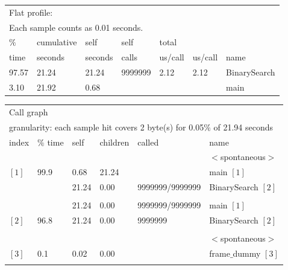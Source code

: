 \documentclass[11pt]{article}
\begin{document}
\begin{enumerate}
\begin{table}[H]
\begin{tabular}{l l l l l l l}
\multicolumn{7}{l}{Flat profile:}\\
\multicolumn{7}{l}{Each sample counts as 0.01 seconds.}\\
 $\%$  & cumulative &  self        &      self   &  total     &      &    \\
 time   & seconds     & seconds  &   calls    & us/call  & us/call & name    \\   
 97.57 &    21.24  &  21.24 & 9999999   &  2.12    & 2.12 & BinarySearch\\
  3.10    & 21.92  &   0.68    & & & &                         main\\
\end{tabular}
 \end{table}
 
\begin{table}[H]
\begin{tabular}{  l  l  l  l  l  l  }
\multicolumn{6}{l}{Call graph}\\
\multicolumn{6}{l}{granularity: each sample hit covers 2 byte(s) for 0.05$\%$ of 21.94 seconds}\\
index   & $\%$ time &   self & children  &  called  &   name \\
            &                   &           &                &              &  $<$spontaneous$>$ \\
$[1]$   &   99.9        & 0.68  &  21.24     &              &  main $[1]$ \\
            &                   & 21.24 &  0.00      & 9999999/9999999   &  BinarySearch $[2]$ \\
\hline \\
            &                  & 21.24  &  0.00      & 9999999/9999999 &    main $[1]$ \\
$[2]$   &  96.8       & 21.24  &  0.00      & 9999999                   &     BinarySearch $[2]$ \\
\hline \\
            &                   &           &                &              &  $<$spontaneous$>$ \\
$[3]$  &    0.1   & 0.02 &  0.00         &    &    frame$\_$dummy $[3]$ \\
\hline \\
\end{tabular}
\end{table}
\end{enumerate}
\end{document}

